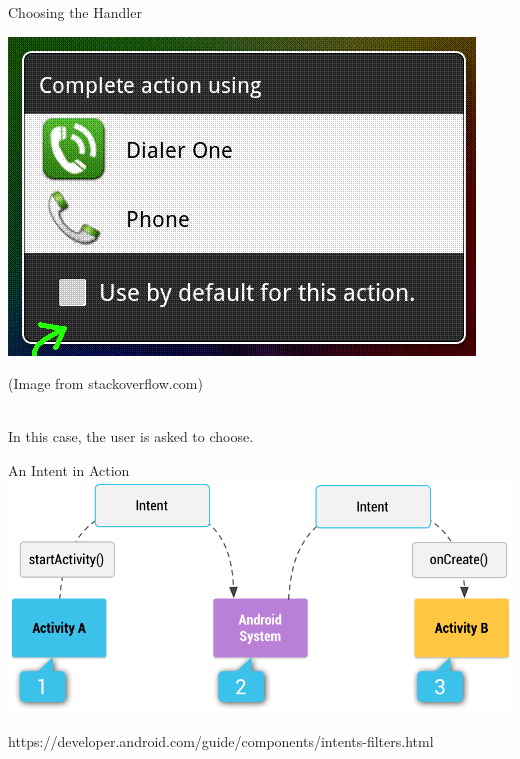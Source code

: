 \documentclass[aspectratio=169]{beamer}
\begin{document}
\begin{frame}{Choosing the Handler}
\begin{center}
\includegraphics[height=.5\textheight]{img/completeaction.png}
\end{center}
\begin{tiny}(Image from stackoverflow.com)\end{tiny} \\
\vspace{0.5em}
In this case, the user is asked to choose.
\end{frame}



\begin{frame}{An Intent in Action}
\centering
\includegraphics[height=0.8\textheight]{img/intent-filters@2x.png} \\
\begin{tiny}https://developer.android.com/guide/components/intents-filters.html\end{tiny}
\end{frame}
\end{document}
